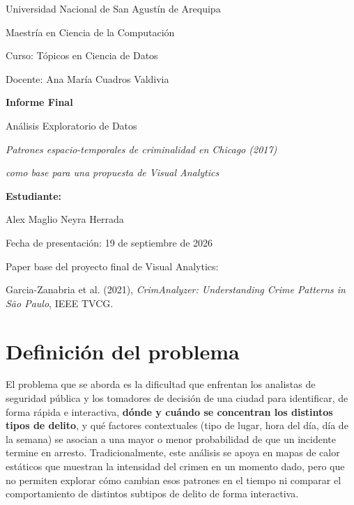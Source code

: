 \documentclass[11pt,a4paper]{article}
\begin{document}
\begin{titlepage}
\centering
\vspace*{1.5cm}

{\large Universidad Nacional de San Agustín de Arequipa\par}
{\large Maestría en Ciencia de la Computación\par}
{\large Curso: Tópicos en Ciencia de Datos\par}
\vspace{0.3cm}
{\small Docente: Ana María Cuadros Valdivia\par}

\vspace{2.5cm}
{\Huge\bfseries Informe Final\par}
\vspace{0.5cm}
{\Large Análisis Exploratorio de Datos\par}
\vspace{0.8cm}
{\large\itshape Patrones espacio-temporales de criminalidad en Chicago (2017)\par}
{\large\itshape como base para una propuesta de Visual Analytics\par}

\vspace{2.5cm}
{\large\bfseries Estudiante:\par}
{\large Alex Maglio Neyra Herrada\par}

\vspace{2cm}
{\large Fecha de presentación: 19 de septiembre de 2026\par}

\vfill
{\small Paper base del proyecto final de Visual Analytics:\par
Garcia-Zanabria et al. (2021), \textit{CrimAnalyzer: Understanding Crime
Patterns in São Paulo}, IEEE TVCG.\par}
\end{titlepage}

\tableofcontents
\newpage

\section{Definición del problema}

El problema que se aborda es la dificultad que enfrentan los analistas de
seguridad pública y los tomadores de decisión de una ciudad para identificar,
de forma rápida e interactiva, \textbf{dónde y cuándo se concentran los
distintos tipos de delito}, y qué factores contextuales (tipo de lugar, hora
del día, día de la semana) se asocian a una mayor o menor probabilidad de que
un incidente termine en arresto. Tradicionalmente, este análisis se apoya en
mapas de calor estáticos que muestran la intensidad del crimen en un momento
dado, pero que no permiten explorar cómo cambian esos patrones en el tiempo
ni comparar el comportamiento de distintos subtipos de delito de forma
interactiva.
\end{document}

